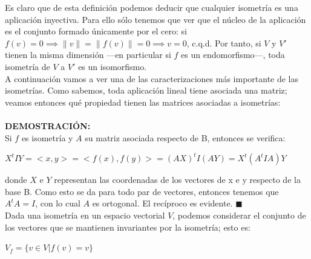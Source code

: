 \documentclass[10pt,a4paper]{article}
\theoremstyle{mystyle}
\newtheorem{teo}{\textcolor{blue}{\textbf{Teorema}}}
\begin{document}
Es claro que de esta definición podemos deducir que cualquier isometría es una aplicación inyectiva. Para ello sólo tenemos que ver que el núcleo de la aplicación es el conjunto formado únicamente por el cero: si $f(v) = 0 \implies \lVert v \rVert= \lVert f(v) \rVert = 0 \implies v = 0$, c.q.d. Por tanto, si $V$ y $V'$ tienen la misma dimensión ---en particular si $f$ es un endomorfismo---, toda isometría de $V$ a $V'$ es un isomorfismo.\\

A continuación vamos a ver una de las caracterizaciones más importante de las isometrías. Como sabemos, toda aplicación lineal tiene asociada una matriz; veamos entonces qué propiedad tienen las matrices asociadas a isometrías:\\

\hfill \\

\textbf{DEMOSTRACIÓN:}\\

Si $f$ es isometría y $A$ su matriz asociada respecto de B, entonces se verifica:\\

\begin{center}
$X^tIY = <x,y> = <f(x),f(y)> = (AX)^tI(AY) = X^t(A^tIA)Y$
\end{center}

donde $X$ e $Y$ representan las coordenadas de los vectores de x e y respecto de la base B. Como esto se da para todo par de vectores, entonces tenemos que $A^tA = I$, con lo cual $A$ es ortogonal. El recíproco es evidente. $\blacksquare$\\

Dada una isometría en un espacio vectorial $V$, podemos considerar el conjunto de los vectores que se mantienen invariantes por la isometría; esto es:\\

\begin{center}
$V_f = \lbrace v \in V \vert f(v) = v \rbrace$
\end{center}
\end{document}
